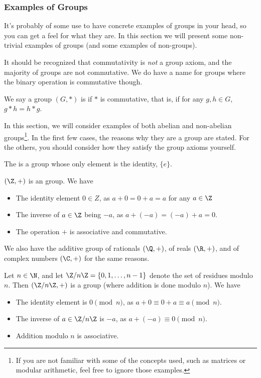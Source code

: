 \documentclass[a4paper]{scrartcl}
\newcommand{\newsubsection}{\subsubsection}
\begin{document}
\newsubsection{Examples of Groups}

It's probably of some use to have concrete examples of groups in your head, so you can get a feel for what they are. In this section we will present some non-trivial examples of groups (and some examples of non-groups).

It should be recognized that commutativity is \emph{not} a group axiom, and the majority of groups are not commutative. We do have a name for groups where the binary operation is commutative though.

\begin{definition}
	We say a group $(G, *)$ is  if $*$ is commutative, that is, if for any $g, h \in G$, $g * h = h * g$.
\end{definition}

In this section, we will consider examples of both abelian and non-abelian groups\footnote{If you are not familiar with some of the concepts used, such as matrices or modular arithmetic, feel free to ignore those examples.}. In the first few cases, the reasons why they are a group are stated. For the others, you should consider how they satisfy the group axioms yourself. 

\begin{example}
	The  is a group whose only element is the identity, $\{ e \}$.
\end{example}

\begin{example}
	$(\Z, +)$ is an group. We have
	\begin{itemize}
		\item The identity element $0 \in Z$, as $a + 0 = 0 + a = a$ for any $a \in \Z$
		\item The inverse of $a \in \Z$ being $-a$, as $a + (-a) = (-a) + a = 0$. 
		\item The operation $+$ is associative and commutative.
	\end{itemize}
\end{example}
We also have the additive group of rationals $(\Q, +)$, of reals $(\R, +)$, and of complex numbers $(\C, +)$ for the same reasons.

\begin{example}
	Let $n \in \N$, and let $\Z/n \Z = \{0, 1, \dots, n - 1\}$ denote the set of residues modulo $n$. Then $(\Z/n\Z, +)$ is a group (where addition is done modulo $n$). We have
	\begin{itemize}
		\item The identity element is $0 \pmod{n}$, as $a + 0 \equiv 0 + a \equiv a \pmod{n}$.
		\item The inverse of $a \in \Z/n\Z$ is $-a$, as $a + (-a) \equiv 0 \pmod{n}$.
		\item Addition modulo $n$ is associative.
	\end{itemize}
\end{example}
\end{document}
